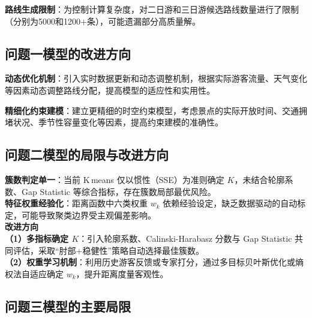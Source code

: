 \noindent\textbf{路线生成限制}：为控制计算复杂度，对二日游和三日游候选路线数量进行了限制（分别为5000和1200+条），可能遗漏部分高质量解。


\subsection[\hspace{-2pt}问题一模型的改进方向]{{\heiti{} \hspace{-8pt}问题一模型的改进方向}}\label{subsection5: 问题一模型改进}

\noindent\textbf{动态优化机制}：引入实时数据更新和动态调整机制，根据实际游客流量、天气变化等因素动态调整路线分配，提高模型的适应性和实用性。

\noindent\textbf{精细化约束建模}：建立更精细的时空约束模型，考虑景点的实际开放时间、交通拥堵状况、季节性容量变化等因素，提高约束建模的准确性。


\subsection[\hspace{-2pt}问题二模型的局限与改进方向]{{\heiti{}\hspace{-8pt}问题二模型的局限与改进方向}}\label{subsection6: 问题二模型改进}

\noindent\textbf{簇数判定单一}：当前 K\,means 仅以惯性（SSE）为准则确定 $K$，未结合轮廓系数、Gap Statistic 等综合指标，存在簇数局部最优风险。\\[2pt]
\noindent\textbf{特征权重经验化}：距离函数中六类权重 $w_k$ 依赖经验设定，缺乏数据驱动的自动标定，可能导致聚类边界受主观偏差影响。\\[2pt]

\noindent\textbf{改进方向}\\
\noindent\textbf{（1）多指标确定 $K$}：引入轮廓系数、Calinski-Harabasz 分数与 Gap Statistic 共同评估，采取“肘部+稳健性”策略自动选择最佳簇数。\\
\noindent\textbf{（2）权重学习机制}：利用历史游客反馈或专家打分，通过多目标贝叶斯优化或熵权法自适应确定 $w_k$，提升距离度量客观性。\\


\subsection[\hspace{-2pt}问题三模型的主要局限]{{\heiti{} \hspace{-8pt}问题三模型的主要局限}}\label{subsection5: 问题三模型局限}


